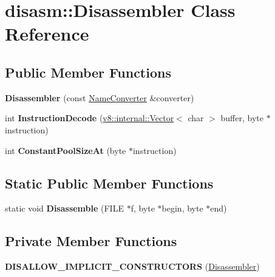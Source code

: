 \hypertarget{classdisasm_1_1_disassembler}{}\section{disasm\+:\+:Disassembler Class Reference}
\label{classdisasm_1_1_disassembler}
\subsection*{Public Member Functions}
\begin{DoxyCompactItemize}
\item 
{\bfseries Disassembler} (const \hyperlink{classdisasm_1_1_name_converter}{Name\+Converter} \&converter)\hypertarget{classdisasm_1_1_disassembler_a316f56d6b74b4785b50e61ee1586e9a0}{}\label{classdisasm_1_1_disassembler_a316f56d6b74b4785b50e61ee1586e9a0}

\item 
int {\bfseries Instruction\+Decode} (\hyperlink{classv8_1_1internal_1_1_vector}{v8\+::internal\+::\+Vector}$<$ char $>$ buffer, byte $\ast$instruction)\hypertarget{classdisasm_1_1_disassembler_ad9cd04c72d0e03d72f0620a67dc95b8f}{}\label{classdisasm_1_1_disassembler_ad9cd04c72d0e03d72f0620a67dc95b8f}

\item 
int {\bfseries Constant\+Pool\+Size\+At} (byte $\ast$instruction)\hypertarget{classdisasm_1_1_disassembler_afb85ab5c4d646b7a1aeea00797c05b30}{}\label{classdisasm_1_1_disassembler_afb85ab5c4d646b7a1aeea00797c05b30}

\end{DoxyCompactItemize}
\subsection*{Static Public Member Functions}
\begin{DoxyCompactItemize}
\item 
static void {\bfseries Disassemble} (F\+I\+LE $\ast$f, byte $\ast$begin, byte $\ast$end)\hypertarget{classdisasm_1_1_disassembler_a53c900eb1da29da0e2828f9fa809bfb6}{}\label{classdisasm_1_1_disassembler_a53c900eb1da29da0e2828f9fa809bfb6}

\end{DoxyCompactItemize}
\subsection*{Private Member Functions}
\begin{DoxyCompactItemize}
\item 
{\bfseries D\+I\+S\+A\+L\+L\+O\+W\+\_\+\+I\+M\+P\+L\+I\+C\+I\+T\+\_\+\+C\+O\+N\+S\+T\+R\+U\+C\+T\+O\+RS} (\hyperlink{classdisasm_1_1_disassembler}{Disassembler})\hypertarget{classdisasm_1_1_disassembler_ab529e76497b1a32f33afca3879f77043}{}\label{classdisasm_1_1_disassembler_ab529e76497b1a32f33afca3879f77043}

\end{DoxyCompactItemize}
